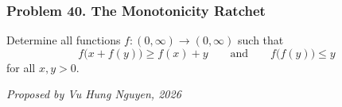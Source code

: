 \subsubsection*{Problem 40. The Monotonicity Ratchet}

\begin{exercisebox}[medium]

Determine all functions $f:(0,\infty)\to(0,\infty)$ such that
\[
\boxed{\quad f\bigl(x+f(y)\bigr)\ge f(x)+y\qquad\text{and}\qquad f\bigl(f(y)\bigr)\le y\quad}
\]
for all $x,y>0$.

\begin{flushright}
\textit{Proposed by Vu Hung Nguyen, 2026}
\end{flushright}


\end{exercisebox}
